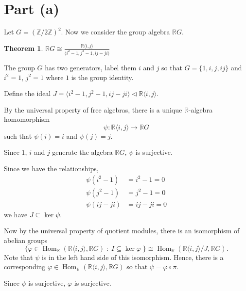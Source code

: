 \documentclass[10pt]{article}
\newtheorem{theorem}{Theorem}
\newenvironment{proof}[1][Proof]{\begin{trivlist}
\item[\hskip \labelsep {\bfseries #1}]}{\end{trivlist}}
\newcommand{\isom}{\cong}
\newcommand{\Hom}{\operatorname{Hom}}
\begin{document}
\section*{Part (a)}
Let $G = (\mathbb{Z}/2\mathbb{Z})^2$. Now we consider the group
algebra $\mathbb{R}G$.
\begin{theorem}
    $\mathbb{R}G \isom \frac{\mathbb{R}\langle i,j\rangle}{\langle i^2-1,j^2-1,ij-ji\rangle}$
\end{theorem}
\begin{proof}
    The group $G$ has two generators, label
    them $i$ and $j$ so that $G = \{1,i,j,ij\}$
    and $i^2 = 1$, $j^2 = 1$ where $1$ is the group identity.
    
    Define the ideal $J = \langle i^2-1,j^2-1,ij-ji\rangle \lhd \mathbb{R}\langle i,j\rangle$.
    
    By the universal property of free algebras,
    there is a unique $\mathbb{R}$-algebra homomorphism
    \begin{equation*}
        \psi:\mathbb{R}\langle i,j\rangle\rightarrow \mathbb{R}G
    \end{equation*}
    such that $\psi(i) = i$ and $\psi(j) = j$. 
    
    Since $1$, $i$ and $j$ generate the algebra $\mathbb{R}G$, 
    $\psi$ is surjective.
    
    Since we have the relationships,
    \begin{align*}
        \psi(i^2-1) &= i^2-1 = 0\\
        \psi(j^2-1) &= j^2-1 = 0\\
        \psi(ij-ji) &= ij-ji = 0
    \end{align*}
    we have $J\subseteq \ker\psi$.
    
    Now by the universal property of quotient modules, there is an isomorphism
    of abelian groups
    \begin{equation*}
        \{\varphi \in \Hom_\mathbb{R}(\mathbb{R}\langle i,j\rangle,\mathbb{R}G)
        \;:\;I\subseteq \ker\varphi\;\} \isom \Hom_\mathbb{R}(\mathbb{R}\langle i,j\rangle/J,\mathbb{R}G).
    \end{equation*}
    Note that $\psi$ is in the left hand side of this isomorphism. Hence, there is a corresponding
    $\varphi \in \Hom_\mathbb{R}(\mathbb{R}\langle i,j\rangle,\mathbb{R}G)$
    so that $\psi = \varphi\circ\pi$.
    
    Since $\psi$ is surjective, $\varphi$ is surjective.
    

\end{proof}
\end{document}
